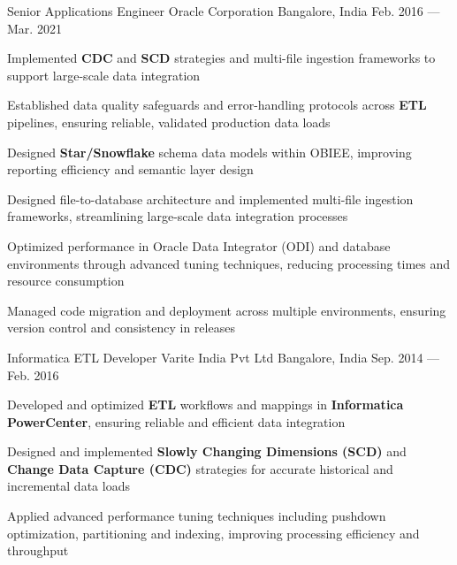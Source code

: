 \begin{cventries}
  \cventry
  {Senior Applications Engineer} %
  {Oracle Corporation} %
  {Bangalore, India} %
  {Feb. 2016 --- Mar. 2021} %
  {
    \begin{cvitems}
    \item {Implemented \textbf{CDC} and \textbf{SCD} strategies and multi-file ingestion frameworks to support large-scale data integration}
    \item {Established data quality safeguards and error-handling protocols across \textbf{ETL} pipelines, ensuring reliable, validated production data loads}
    \item {Designed \textbf{Star/Snowflake} schema data models within OBIEE, improving reporting efficiency and semantic layer design}
    \item {Designed file-to-database architecture and implemented multi-file ingestion frameworks, streamlining large-scale data integration processes}
    \item {Optimized performance in Oracle Data Integrator (ODI) and database environments through advanced tuning techniques, reducing processing times and resource consumption}
    \item {Managed code migration and deployment across multiple environments, ensuring version control and consistency in releases}
    \end{cvitems}
  }

  \cventry
  {Informatica ETL Developer} %
  {Varite India Pvt Ltd} %
  {Bangalore, India} %
  {Sep. 2014 --- Feb. 2016} %
  {
    \begin{cvitems}
    \item {Developed and optimized \textbf{ETL} workflows and mappings in \textbf{Informatica PowerCenter}, ensuring reliable and efficient data integration}
    \item {Designed and implemented \textbf{Slowly Changing Dimensions (SCD)} and \textbf{Change Data Capture (CDC)} strategies for accurate historical and incremental data loads}
    \item {Applied advanced performance tuning techniques including pushdown optimization, partitioning and indexing, improving processing efficiency and throughput}
    \end{cvitems}
  }

\end{cventries}